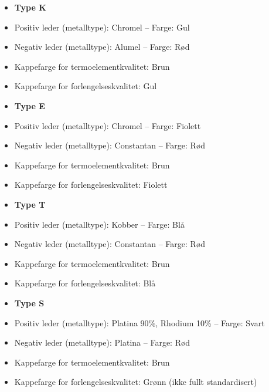 \vskip 10pt

\begin{itemize}
\item{} {\bf Type K}
\item{} Positiv leder (metalltype): Chromel -- Farge: Gul
\item{} Negativ leder (metalltype): Alumel -- Farge: Rød
\item{} Kappefarge for termoelementkvalitet: Brun
\item{} Kappefarge for forlengelseskvalitet: Gul
\end{itemize}

\vskip 10pt

\begin{itemize}
\item{} {\bf Type E}
\item{} Positiv leder (metalltype): Chromel -- Farge: Fiolett
\item{} Negativ leder (metalltype): Constantan -- Farge: Rød
\item{} Kappefarge for termoelementkvalitet: Brun
\item{} Kappefarge for forlengelseskvalitet: Fiolett
\end{itemize}

\vskip 10pt

\begin{itemize}
\item{} {\bf Type T}
\item{} Positiv leder (metalltype): Kobber -- Farge: Blå
\item{} Negativ leder (metalltype): Constantan -- Farge: Rød
\item{} Kappefarge for termoelementkvalitet: Brun
\item{} Kappefarge for forlengelseskvalitet: Blå
\end{itemize}

\vskip 10pt

\begin{itemize}
\item{} {\bf Type S}
\item{} Positiv leder (metalltype): Platina 90\%, Rhodium 10\% -- Farge: Svart
\item{} Negativ leder (metalltype): Platina -- Farge: Rød
\item{} Kappefarge for termoelementkvalitet: Brun
\item{} Kappefarge for forlengelseskvalitet: Grønn (ikke fullt standardisert)
\end{itemize}

